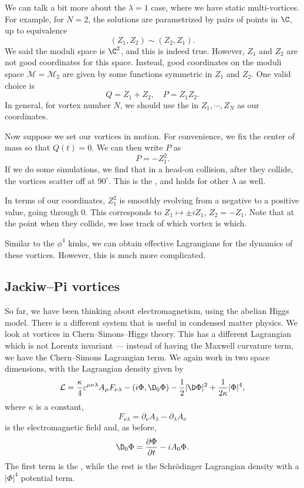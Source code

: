 \documentclass[a4paper]{article}
\begin{document}
We can talk a bit more about the $\lambda = 1$ case, where we have static multi-vortices. For example, for $N = 2$, the solutions are parametrized by pairs of points in $\C$, up to equivalence
\[
  (Z_1, Z_2) \sim (Z_2, Z_1).
\]
We said the moduli space is $\C^2$, and this is indeed true. However, $Z_1$ and $Z_2$ are not good coordinates for this space. Instead, good coordinates on the moduli space $\mathcal{M} = \mathcal{M}_2$ are given by some functions symmetric in $Z_1$ and $Z_2$. One valid choice is
\[
  Q = Z_1 + Z_2,\quad P = Z_1 Z_2.
\]
In general, for vortex number $N$, we should use the  in $Z_1, \cdots, Z_N$ as our coordinates.

Now suppose we set our vortices in motion. For convenience, we fix the center of mass so that $Q(t) = 0$. We can then write $P$ as
\[
  P = - Z_1^2.
\]
If we do some simulations, we find that in a head-on collision, after they collide, the vortices scatter off at $90^\circ$. This is the , and holds for other $\lambda$ as well.

In terms of our coordinates, $Z_1^2$ is smoothly evolving from a negative to a positive value, going through $0$. This corresponds to $Z_1 \mapsto \pm i Z_1$, $Z_2 = - Z_1$. Note that at the point when they collide, we lose track of which vortex is which.

Similar to the $\phi^4$ kinks, we can obtain effective Lagrangians for the dynamics of these vortices. However, this is much more complicated.

\subsection{Jackiw--Pi vortices}
So far, we have been thinking about electromagnetism, using the abelian Higgs model. There is a different system that is useful in condensed matter physics. We look at vortices in Chern--Simons--Higgs theory. This has a different Lagrangian which is not Lorentz invariant --- instead of having the Maxwell curvature term, we have the Chern--Simons Lagrangian term. We again work in two space dimensions, with the Lagrangian density given by
\[
  \mathcal{L} = \frac{\kappa}{4} \varepsilon^{\mu\nu\lambda} A_\mu F_{\nu\lambda} - (i \Phi, \D_0 \Phi) - \frac{1}{2} | \D \Phi|^2 + \frac{1}{2\kappa} |\Phi|^4,
\]
where $\kappa$ is a constant,
\[
  F_{\nu \lambda} = \partial_\nu A_\lambda - \partial_\lambda A_\nu
\]
is the electromagnetic field and, as before,
\[
  \D_0 \Phi = \frac{\partial \Phi}{\partial t} - i A_0 \Phi.
\]
The first term is the , while the rest is the Schr\"odinger Lagrangian density with a $|\Phi|^4$ potential term.
\end{document}
